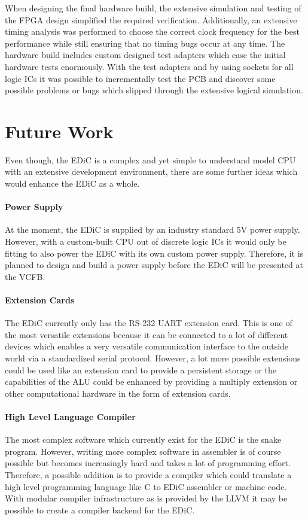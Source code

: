 When designing the final hardware build, the extensive simulation and testing of the \gls{FPGA} design simplified the required verification.
Additionally, an extensive timing analysis was performed to choose the correct clock frequency for the best performance while still ensuring that no timing bugs occur at any time.
The hardware build includes custom designed test adapters which ease the initial hardware tests enormously.
With the test adapters and by using sockets for all logic \glspl{IC} it was possible to incrementally test the \gls{PCB} and discover some possible problems or bugs which slipped through the extensive logical simulation.

\section{Future Work}
Even though, the \gls{EDiC} is a complex and yet simple to understand model \gls{CPU} with an extensive development environment, there are some further ideas which would enhance the \gls{EDiC} as a whole.

\paragraph{Power Supply} At the moment, the \gls{EDiC} is supplied by an industry standard 5V power supply.
However, with a custom-built \gls{CPU} out of discrete logic \glspl{IC} it would only be fitting to also power the \gls{EDiC} with its own custom power supply.
Therefore, it is planned to design and build a power supply before the \gls{EDiC} will be presented at the \gls{VCFB}. \cite{vcfb}

\paragraph{Extension Cards} The \gls{EDiC} currently only has the RS-232 \gls{UART} extension card.
This is one of the most versatile extensions because it can be connected to a lot of different devices which enables a very versatile communication interface to the outside world via a standardized serial protocol.
However, a lot more possible extensions could be used like an extension card to provide a persistent storage or the capabilities of the \gls{ALU} could be enhanced by providing a multiply extension or other computational hardware in the form of extension cards.

\paragraph{High Level Language Compiler} The most complex software which currently exist for the \gls{EDiC} is the snake program.
However, writing more complex software in assembler is of course possible but becomes increasingly hard and takes a lot of programming effort.
Therefore, a possible addition is to provide a compiler which could translate a high level programming language like C to \gls{EDiC} assembler or machine code.
With modular compiler infrastructure as is provided by the LLVM it may be possible to create a compiler backend for the \gls{EDiC}.
